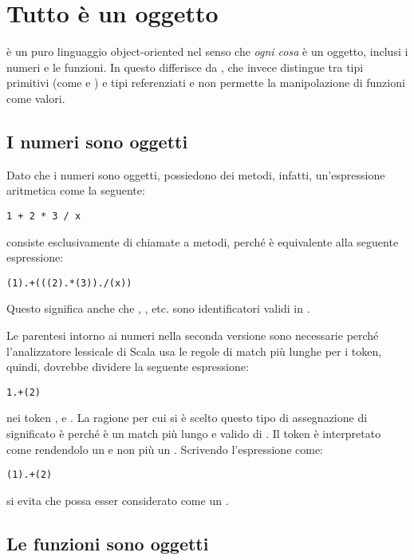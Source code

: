 \section{Tutto \`e un oggetto}
\label{sec:everything-an-object}

\Scala \`e un puro linguaggio object-oriented nel senso che \emph{ogni cosa} \`e un oggetto, inclusi i numeri e le funzioni. In questo differisce da \Java, che invece distingue tra tipi primitivi (come  e ) e tipi referenziati e non permette la manipolazione di funzioni come valori.

\subsection{I numeri sono oggetti}
\label{sec:numbers-are-objects}

Dato che i numeri sono oggetti, possiedono dei metodi, infatti, un'espressione aritmetica come la seguente:
\begin{lstlisting}
1 + 2 * 3 / x
\end{lstlisting}
consiste esclusivamente di chiamate a metodi, perch\'e \`e equivalente alla seguente espressione:
\begin{lstlisting}
(1).+(((2).*(3))./(x))
\end{lstlisting}
Questo significa anche che \code{+}, \code{*}, etc. sono identificatori validi in \Scala.

Le parentesi intorno ai numeri nella seconda versione sono necessarie perch\'e 
\newline l'analizzatore lessicale di Scala usa le regole di match pi\`u lunghe per i token, quindi, dovrebbe dividere la seguente espressione:
\begin{lstlisting}
1.+(2)
\end{lstlisting}
nei token , \code{+} e . La ragione per cui si \`e scelto questo tipo di assegnazione di significato \`e perch\'e  \`e un match pi\`u lungo e valido di . Il token  \`e interpretato come  rendendolo un  e non pi\`u un . Scrivendo l'espressione come:
\begin{lstlisting}
(1).+(2)
\end{lstlisting}
si evita che  possa esser considerato come un .

\subsection{Le funzioni sono oggetti}
\label{sec:funct-are-objects}

